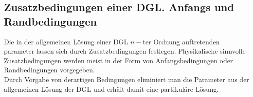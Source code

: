 \begin{enumerate}
\begin{figure}[ht]
\begin{minipage}[b]{0.45\linewidth}
\begin{center}
\end{center}

\end{minipage}
\end{figure}










\subsection*{Zusatzbedingungen einer DGL. Anfangs und Randbedingungen}
Die in der allgemeinen Lösung einer DGL $n-$ter Ordnung auftretenden parameter lassen sich durch Zusatzbedingungen festlegen. Physikalische sinnvolle Zusatzbedingungen werden meist in der Form von Anfangsbedingungen oder Randbedingungen vorgegeben. \\

Durch Vorgabe von derartigen Bedingungen eliminiert man die Parameter aus der allgemeinen Lösung der DGL und erhält damit eine partikuläre Lösung.

\end{enumerate}
